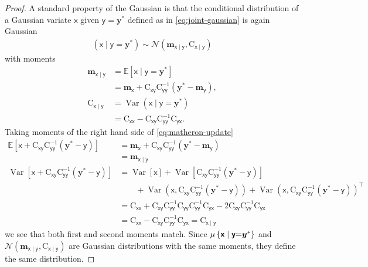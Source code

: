 \documentclass[wcp]{jmlr} %
\newcommand{\Ex}{\mathbb{E}}
\newcommand{\var}{\operatorname{Var}}
\newcommand{\vv}[1]{\boldsymbol{#1}}
\newcommand{\mm}[1]{\mathrm{#1}}
\newcommand{\rv}[1]{\mathsf{#1}}
\newcommand{\vrv}[1]{\vv{\rv{#1}}}
\newcommand{\Normal}{\mathcal{N}}
\newcommand{\gvn}{\mid}
\begin{document}
\begin{proof}
    A standard property of the Gaussian \citep[e.g.][]{Petersen2012Matrix} is that the conditional distribution of a Gaussian variate  $\vrv{x}$ given $\vrv{y} = \vv{y}^*$ defined as in \eqref{eq:joint-gaussian} is again Gaussian
    \begin{align}
        \left(\vrv{x} \gvn \vrv{y} {=} \vv{y}^*\right)
        \sim\Normal(\vv{m}_{\vrv{x}\gvn\vrv{y}}, \mm{C}_{\vrv{x}\gvn\vrv{y}})\label{eq:conditional-gaussian}
    \end{align}
    with moments
    \begin{align}
        \vv{m}_{\vrv{x}\gvn\vrv{y}}
            &=\Ex [\vrv{x} \gvn \vrv{y} {=} \vv{y}^*] \\
            &= \vv{m}_{\vrv{x}} + \mm{C}_{\vrv{xy}} \mm{C}_{\vrv{yy}}^{-1} \left( \vv{y}^* - \vv{m}_{\vrv{y}} \right), \label{eq:conditional-mean}\\
        \mm{C}_{\vrv{x}\gvn\vrv{y}}
            &= \var \left(\vrv{x} \gvn \vrv{y} {=} \vv{y}^*\right) \\
            &= \mm{C}_{\vrv{xx}} - \mm{C}_{\vrv{xy}} \mm{C}_{\vrv{yy}}^{-1} \mm{C}_{\vrv{yx}}. \label{eq:conditional-cov}
    \end{align}
Taking moments of the right hand side of \eqref{eq:matheron-update}
\begin{align}
\Ex\left[\vrv{x}+\mm{C}_{\vrv{xy}} \mm{C}_{\vrv{yy}}^{-1}(\vv{y}^*-\vrv{y})\right]
&=\vv{m}_{\vrv{x}} +\mm{C}_{\vrv{xy}}\mm{C}_{\vrv{yy}}^{-1}(\vv{y}^*-\vv{m}_{\vrv{y}})\\
&=\vv{m}_{\vrv{x}\gvn\vrv{y}}\\
\var\left[\vrv{x}+\mm{C}_{\vrv{xy}} \mm{C}_{\vrv{yy}}^{-1}(\vv{y}^*-\vrv{y})\right]
&=
    \var[\vrv{x}]+\var[\mm{C}_{\vrv{xy}} \mm{C}_{\vrv{yy}}^{-1}(\vv{y}^*-\vrv{y})] \\
    &\hspace{2em} +\var(\vrv{x},\mm{C}_{\vrv{xy}} \mm{C}_{\vrv{yy}}^{-1}(\vv{y}^*-\vrv{y}))
    +\var(\vrv{x},\mm{C}_{\vrv{xy}} \mm{C}_{\vrv{yy}}^{-1}(\vv{y}^*-\vrv{y}))^{\top}\\
&=\mm{C}_{\vrv{x}\vrv{x}} +\mm{C}_{\vrv{xy}} \mm{C}_{\vrv{yy}}^{-1}\mm{C}_{\vrv{yy}} \mm{C}_{\vrv{yy}}^{-1}\mm{C}_{\vrv{yx}}
-  2\mm{C}_{\vrv{xy}} \mm{C}_{\vrv{yy}}^{-1}\mm{C}_{\vrv{yx}}\\
&=\mm{C}_{\vrv{x}\vrv{x}} -\mm{C}_{\vrv{xy}} \mm{C}_{\vrv{yy}}^{-1}\mm{C}_{\vrv{yx}} =\mm{C}_{\vrv{x}\gvn\vrv{y}}
\end{align}
we see that both first and second moments match.
Since $\Law\left\{\vrv{x} \gvn \vrv{y} {=} \vv{y}^*\right\}$ and
$\Normal(\vv{m}_{\vrv{x}\gvn\vrv{y}}, \mm{C}_{\vrv{x}\gvn\vrv{y}})$ are Gaussian distributions with the same moments, they define the same distribution.
\end{proof}
\end{document}
